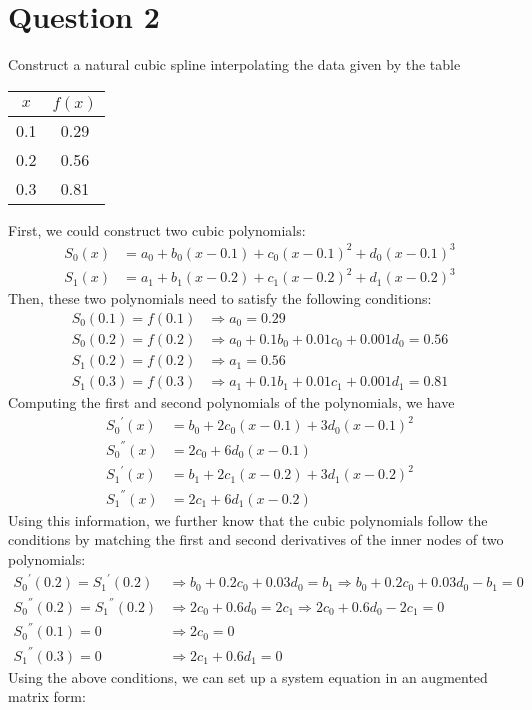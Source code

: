 \section{Question 2}

\begin{question}
    Construct a natural cubic spline interpolating the data given by the table \begin{tabular}{c|c} $x$ & $f(x)$ \\ \hline 0.1 & 0.29 \\ 0.2 & 0.56 \\ 0.3 & 0.81 \end{tabular}
\end{question}

\begin{answer}
    First, we could construct two cubic polynomials:
    \begin{align}
        S_0(x) &= a_0 + b_0(x-0.1) + c_0(x-0.1)^2 + d_0(x-0.1)^3\\
        S_1(x) &= a_1 + b_1(x-0.2) + c_1(x-0.2)^2 + d_1(x-0.2)^3
    \end{align}
    Then, these two polynomials need to satisfy the following conditions:
    \begin{align}
        S_0(0.1) = f(0.1) &\Rightarrow a_0 = 0.29\\
        S_0(0.2) = f(0.2) &\Rightarrow a_0 + 0.1b_0 + 0.01c_0 + 0.001d_0 = 0.56\\
        S_1(0.2) = f(0.2) &\Rightarrow a_1 = 0.56\\
        S_1(0.3) = f(0.3) &\Rightarrow a_1 + 0.1b_1 + 0.01c_1 + 0.001d_1 = 0.81
    \end{align}
    Computing the first and second polynomials of the polynomials, we have
    \begin{align}
        {S_0}^{'}(x) &= b_0 + 2c_0(x-0.1) + 3d_0(x-0.1)^2\\
        {S_0}^{''}(x) &= 2c_0 + 6d_0(x-0.1)\\
        {S_1}^{'}(x) &= b_1 + 2c_1(x-0.2) + 3d_1(x-0.2)^2\\
        {S_1}^{''}(x) &= 2c_1 + 6d_1(x-0.2)
    \end{align}
    Using this information, we further know that the cubic polynomials follow the conditions by matching the first and second derivatives of the inner nodes of two polynomials:
    \begin{align}
        {S_0}^{'}(0.2) = {S_1}^{'}(0.2) &\Rightarrow b_0 + 0.2c_0 + 0.03d_0 = b_1 \Rightarrow b_0 + 0.2c_0 + 0.03d_0 - b_1 = 0\\
        {S_0}^{''}(0.2) = {S_1}^{''}(0.2) &\Rightarrow 2c_0 + 0.6d_0 = 2c_1 \Rightarrow 2c_0 + 0.6d_0 - 2c_1 = 0\\
        {S_0}^{''}(0.1) = 0 &\Rightarrow 2c_0 = 0\\
        {S_1}^{''}(0.3) = 0 &\Rightarrow 2c_1 + 0.6d_1 = 0
    \end{align}
    Using the above conditions, we can set up a system equation in an augmented matrix form:
    

\end{answer}
